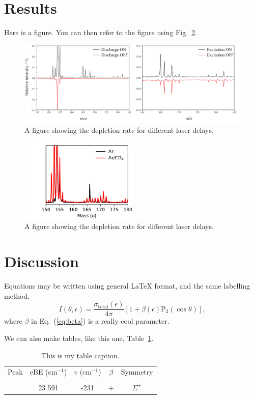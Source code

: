 \documentclass[journal=jacsat,manuscript=article,layout=onecolumn]{achemso}
\begin{document}
\section{Results}
Here is a figure. You can then refer to the figure using Fig.~\ref{fig1-delay}.
\begin{figure}
	\includegraphics[width=1\textwidth]{Figures/discharge-exc}
	\caption{A figure showing the depletion rate for different laser delays.}
	\label{fig1-delay}
\end{figure}

\begin{figure}
	\includegraphics[width=0.5\textwidth]{Figures/CHinsertion/ArVsCD4}
	\caption{A figure showing the depletion rate for different laser delays.}
	\label{fig1-delay}
\end{figure}

\section{Discussion}
Equations may be written using general LaTeX format, and the same labelling method.
\begin{equation}
I(\theta,\epsilon) = \frac{\sigma_{\text{total}}(\epsilon)}{4\pi}[1+\beta(\epsilon)\text{P}_2(\cos\theta)],
\label{eq:beta}
\end{equation}
where $\beta$ in Eq.~(\ref{eq:beta}) is a really cool parameter.

We can also make tables, like this one, Table~\ref{tab:C2H}.
\begin{table}
	\caption{This is my table caption.} \label{tab:C2H}
	\begin{tabular}{c c c c c}
		\hline Peak & eBE (cm$^{-1}$) & $v$ (cm$^{-1}$) & $\beta$ & Symmetry \\ 
		& & & & \\\hline \hline
		& 23 591 & -231 & + & $\Sigma^+$ 
	\end{tabular}
\end{table}
\end{document}
